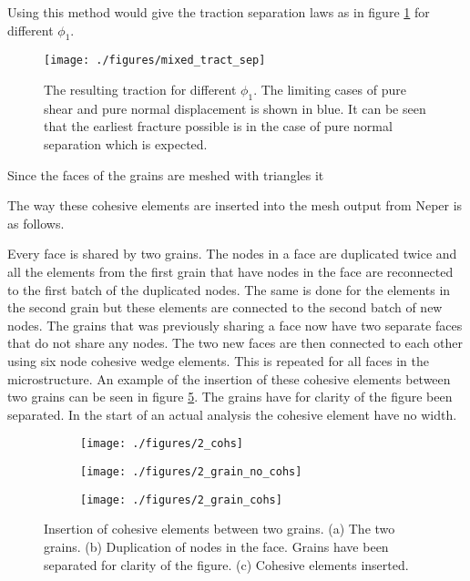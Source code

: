 \documentclass[generate_interface_elements.tex]{subfiles}
\begin{document}
Using this method would give the traction separation laws as in figure \ref{fig:mixed_tract_sep} for different $\phi_1$.

\begin{figure}
\centering
  \texttt{[image: ./figures/mixed\_tract\_sep]}
\caption{The resulting traction for different $\phi_1$. The limiting cases of pure shear and pure normal displacement is shown in blue. It can be seen that the earliest fracture possible is in the case of pure normal separation which is expected. }
\label{fig:mixed_tract_sep}
\end{figure}


Since the faces of the grains are meshed with triangles it 


The way these cohesive elements are inserted into the mesh output from Neper is as follows. 

Every face is shared by two grains. The nodes in a face are duplicated twice and all the elements from the first grain that have nodes in the face are reconnected to the first batch of the duplicated nodes.  The same is done for the elements in the second grain but these elements are connected to the second batch of new nodes. The grains that was previously sharing a face now have two separate faces that do not share any nodes. The two new faces are then connected to each other using six node cohesive wedge elements. This is repeated for all faces in the microstructure. An example of the insertion of these cohesive elements between two grains can be seen in figure \ref{fig:cohs_2}. The grains have for clarity of the figure been separated. In the start of an actual analysis the cohesive element have no width.
\begin{figure}
\centering
\begin{subfigure}[b]{.4\textwidth}
  \centering
  \texttt{[image: ./figures/2\_cohs]}
  \caption{}
  \label{fig:cohs_2_a}
\end{subfigure}%
\hspace{-10mm}
\begin{subfigure}[b]{.4\textwidth}
  \centering
  \texttt{[image: ./figures/2\_grain\_no\_cohs]}
  \caption{}
  \label{fig:cohs_2_b}
\end{subfigure}%
\hspace{-10mm}
\begin{subfigure}[b]{.4\textwidth}
  \centering
  \texttt{[image: ./figures/2\_grain\_cohs]}
  \caption{}
  \label{fig:cohs_2_c}
\end{subfigure}
\caption{Insertion of cohesive elements between two grains. (a) The two grains. (b) Duplication of nodes in the face. Grains have been separated for clarity of the figure. (c) Cohesive elements inserted. }
\label{fig:cohs_2}
\end{figure}
\end{document}
